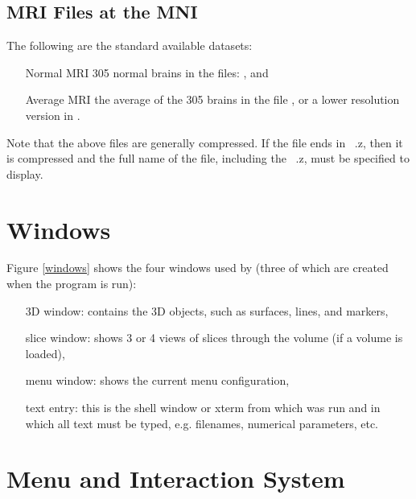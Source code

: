 \subsection{MRI Files at the MNI}

The following are the standard available datasets:

\begin{itemize}
\item[Normal MRI] 305 normal brains in the files:  , and
\item[Average MRI] the average of the 305 brains in the file
, or a lower
resolution version in .
\end{itemize}

Note that the above files are generally compressed.  If the file ends in
\ .z, then it is compressed and the full name of the file, including the
\ .z, must be specified to display.

\section{\display Windows}


Figure \ref{windows} shows the four windows used by \display (three of which
are created when the program is run):

\begin{itemize}
\item[3D window:]  contains the 3D objects, such as surfaces, lines,
                  and markers,
\item[slice window:]  shows 3 or 4 views of slices through the volume
                      (if a volume is loaded),
\item[menu window:]  shows the current menu configuration,
\item[text entry:]  this is the shell window or xterm from which \display was
                   run and in which all text must be typed, e.g. filenames,
                   numerical parameters, etc.
\end{itemize}

\section{Menu and Interaction System}

